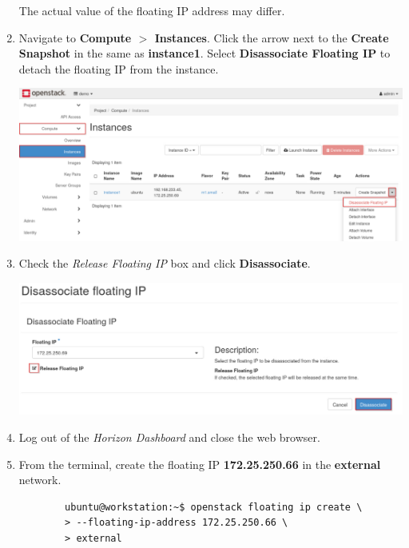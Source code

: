 \documentclass[letterpaper, 12pt]{article}
\begin{document}
\begin{enumerate}
    \begin{notebox}
        The actual value of the floating IP address may differ.
    \end{notebox}

    \item Navigate to \textbf{Compute $>$ Instances}. Click the arrow next to the \textbf{Create Snapshot} in the same
    as \textbf{instance1}. Select \textbf{Disassociate Floating IP} to detach the floating IP from the instance.

    \begin{center}
        \includegraphics[width=\linewidth]{images/part3/step8.png}
    \end{center}

    \item Check the \textit{Release Floating IP} box and click \textbf{Disassociate}.
    
    \begin{center}
        \includegraphics[width=\linewidth]{images/part3/step9.png}
    \end{center}

    \item Log out of the \textit{Horizon Dashboard} and close the web browser.

    \item From the terminal, create the floating IP \textbf{172.25.250.66} in the \textbf{external} network.
    \begin{lstlisting}
        ubuntu@workstation:~$ openstack floating ip create \
        > --floating-ip-address 172.25.250.66 \
        > external
    \end{lstlisting}


\end{enumerate}
\end{document}
